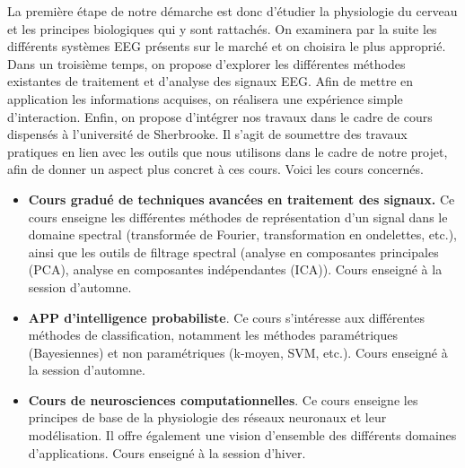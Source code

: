 La première étape de notre démarche est donc d'étudier la physiologie du cerveau et les principes biologiques qui y sont rattachés. On examinera par la suite les différents systèmes EEG présents sur le marché et on choisira le plus approprié. 
Dans un troisième temps, on propose d'explorer les différentes méthodes existantes de traitement et d'analyse des signaux EEG.
Afin de mettre en application les informations acquises, on réalisera une expérience simple d'interaction. 
Enfin, on propose d'intégrer nos travaux dans le cadre de cours dispensés à l'université de Sherbrooke. Il s'agit de soumettre des travaux pratiques en lien avec les outils que nous utilisons dans le cadre de notre projet, afin de donner un aspect plus concret à ces cours. Voici les cours concernés.  
\smallbreak
\begin{itemize}
	\item \textbf{Cours gradué de techniques avancées en traitement des signaux.} Ce cours enseigne les différentes méthodes de représentation d'un signal dans le domaine spectral (transformée de Fourier, transformation en ondelettes, etc.), ainsi que les outils de filtrage spectral (analyse en composantes principales (PCA), analyse en composantes indépendantes (ICA)). Cours enseigné à la session d'automne. 
	\smallbreak
	\item\textbf{APP d'intelligence probabiliste}. Ce cours s'intéresse aux différentes méthodes de classification, notamment les méthodes paramétriques (Bayesiennes) et non paramétriques (k-moyen, SVM, etc.). Cours enseigné à la session d'automne.
	\smallbreak
	\item \textbf{Cours de neurosciences computationnelles}. Ce cours enseigne les principes de base de la physiologie des réseaux neuronaux et leur modélisation. Il offre également une vision d'ensemble des différents domaines d'applications. Cours enseigné à la session d'hiver.
\end{itemize}

